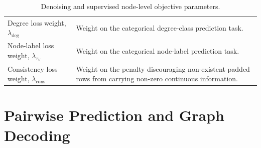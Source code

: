\begin{table}[p]
\begin{tabularx}{\textwidth}{@{}p{}X@{}}
Degree loss weight, \(\lambda_{\mathrm{deg}}\) & Weight on the categorical degree-class prediction task. \\
Node-label loss weight, \(\lambda_{\tau_V}\) & Weight on the categorical node-label prediction task. \\
Consistency loss weight, \(\lambda_{\mathrm{cons}}\) & Weight on the penalty discouraging non-existent padded rows from carrying non-zero continuous information. \\
\bottomrule
\end{tabularx}
\caption{Denoising and supervised node-level objective parameters.}
\label{tab:generator-denoising-parameters}
\end{table}

\section{Pairwise Prediction and Graph Decoding}

